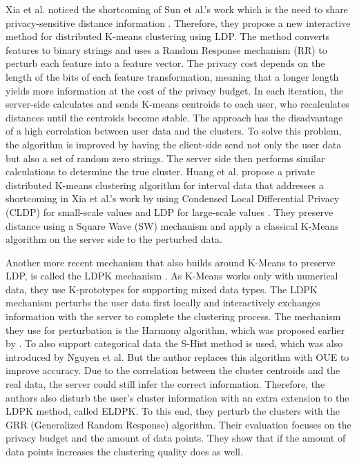 Xia et al. noticed the shortcoming of Sun et al.'s work which is the need to share privacy-sensitive distance information \citep{xia_distributed_2020-1}.
Therefore, they propose a new interactive method for distributed K-means clustering using LDP.
The method converts features to binary strings and uses a Random Response mechanism (RR) to perturb each feature into a feature vector.
The privacy cost depends on the length of the bits of each feature transformation, meaning that a longer length yields more information at the cost of the privacy budget.
In each iteration, the server-side calculates and sends K-means centroids to each user, who recalculates distances until the centroids become stable.
The approach has the disadvantage of a high correlation between user data and the clusters.
To solve this problem, the algorithm is improved by having the client-side send not only the user data but also a set of random zero strings.
The server side then performs similar calculations to determine the true cluster.
Huang et al. propose a private distributed K-means clustering algorithm for interval data that addresses a shortcoming in Xia et al.'s work by using Condensed Local Differential Privacy (CLDP) for small-scale values and LDP for large-scale values \citep{9679364}.
They preserve distance using a Square Wave (SW) mechanism and apply a classical K-Means algorithm on the server side to the perturbed data.

Another more recent mechanism that also builds around K-Means to preserve LDP, is called the LDPK mechanism \citep{yuan_privacypreserving_2021}.
As K-Means works only with numerical data, they use K-prototypes for supporting mixed data types.
The LDPK mechanism perturbs the user data first locally and interactively exchanges information with the server to complete the clustering process.
The mechanism they use for perturbation is the Harmony algorithm, which was proposed earlier by \citep{nguyen_collecting_2016}.
To also support categorical data the S-Hist method is used, which was also introduced by Nguyen et al.
But the author replaces this algorithm with OUE \cite{wang_locally_nodate} to improve accuracy.
Due to the correlation between the cluster centroids and the real data, the server could still infer the correct information.
Therefore, the authors also disturb the user’s cluster information with an extra extension to the LDPK method, called ELDPK.
To this end, they perturb the clusters with the GRR (Generalized Random Response) algorithm.
Their evaluation focuses on the privacy budget and the amount of data points.
They show that if the amount of data points increases the clustering quality does as well. \newline

